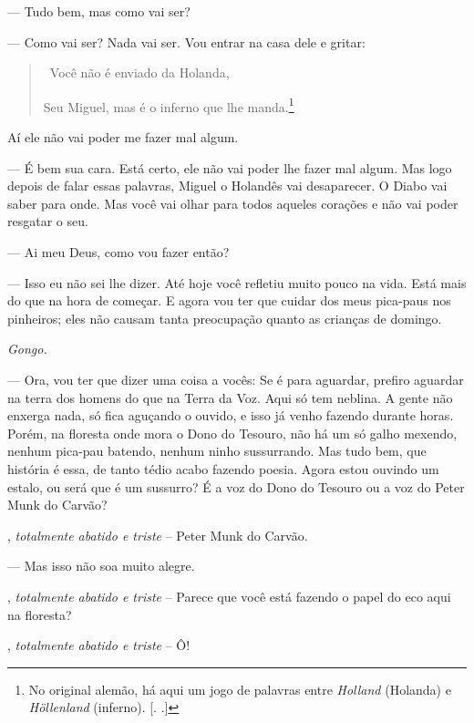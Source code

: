 \begin{myparindent}{0pt}
\begin{Parskip}
 --- Tudo bem, mas como vai ser?

 --- Como vai ser? Nada vai ser. Vou entrar na casa dele e gritar:

\begin{quote}
\quad \, Você não é enviado da Holanda,

Seu Miguel, mas é o inferno que lhe manda.\footnote{No original alemão,
  há aqui um jogo de palavras entre \emph{Holland} (Holanda) e
  \emph{Höllenland} (inferno). [. .]}
\end{quote}

Aí ele não vai poder me fazer mal algum.

 --- É bem sua cara. Está certo, ele não vai poder lhe fazer
mal algum. Mas logo depois de falar essas palavras, Miguel o Holandês
vai desaparecer. O Diabo vai saber para onde. Mas você vai olhar para
todos aqueles corações e não vai poder resgatar o seu.

 --- Ai meu Deus, como vou fazer então?

 --- Isso eu não sei lhe dizer. Até hoje você refletiu muito
pouco na vida. Está mais do que na hora de começar. E agora vou ter que
cuidar dos meus pica-paus nos pinheiros; eles não causam tanta
preocupação quanto as crianças de domingo.

\emph{Gongo.}

 --- Ora, vou ter que dizer uma coisa a vocês: Se é para aguardar,
prefiro aguardar na terra dos homens do que na Terra da Voz. Aqui só tem
neblina. A gente não enxerga nada, só fica aguçando o ouvido, e isso já
venho fazendo durante horas. Porém, na floresta onde mora o Dono do
Tesouro, não há um só galho mexendo, nenhum pica-pau batendo, nenhum
ninho sussurrando. Mas tudo bem, que história é essa, de tanto tédio
acabo fazendo poesia. Agora estou ouvindo um estalo, ou será que é um
sussurro? É a voz do Dono do Tesouro ou a voz do Peter Munk do Carvão?

, \emph{totalmente abatido e triste} -- Peter Munk
do Carvão.

 --- Mas isso não soa muito alegre.

, \emph{totalmente abatido e triste} -- Parece que
você está fazendo o papel do eco aqui na floresta?

, \emph{totalmente abatido e triste} -- Ô!


\end{Parskip}
\end{myparindent}

